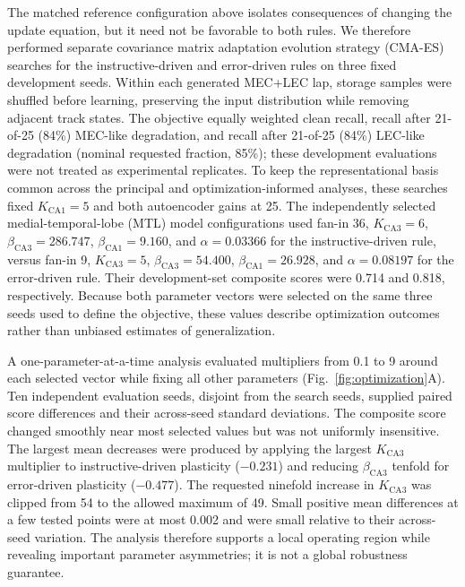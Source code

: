 The matched reference configuration above isolates consequences of changing
the update equation, but it need not be favorable to both rules. We therefore
performed separate covariance matrix adaptation evolution strategy (CMA-ES)
searches for the instructive-driven and error-driven rules on three fixed
development seeds. Within each generated MEC+LEC lap, storage samples were
shuffled before learning, preserving the input distribution while removing
adjacent track states. The objective equally weighted clean recall, recall after
21-of-25 (84\%) MEC-like degradation, and recall after 21-of-25 (84\%)
LEC-like degradation (nominal requested fraction, 85\%); these
development evaluations were not treated as experimental replicates. To keep
the representational basis common across the principal and optimization-informed
analyses, these searches fixed $K_{\mathrm{CA1}}=5$ and both autoencoder gains
at 25. The independently selected medial-temporal-lobe (MTL) model
configurations used fan-in 36,
$K_{\mathrm{CA3}}=6$, $\beta_{\mathrm{CA3}}=286.747$,
$\beta_{\mathrm{CA1}}=9.160$, and $\alpha=0.03366$ for the
instructive-driven rule, versus fan-in 9, $K_{\mathrm{CA3}}=5$,
$\beta_{\mathrm{CA3}}=54.400$, $\beta_{\mathrm{CA1}}=26.928$, and
$\alpha=0.08197$ for the error-driven rule. Their development-set composite
scores were 0.714 and 0.818, respectively. Because both parameter vectors were selected on the same
three seeds used to define the objective, these values describe optimization
outcomes rather than unbiased estimates of generalization.

A one-parameter-at-a-time analysis evaluated multipliers from 0.1 to 9 around
each selected vector while fixing all other parameters
(Fig.~\ref{fig:optimization}A). Ten independent evaluation seeds, disjoint from
the search seeds, supplied paired score differences and their across-seed
standard deviations. The composite score changed smoothly near most selected
values but was not uniformly insensitive. The largest mean decreases were
produced by applying the largest $K_{\mathrm{CA3}}$ multiplier to instructive-driven
plasticity ($-0.231$) and reducing $\beta_{\mathrm{CA3}}$ tenfold for
error-driven plasticity ($-0.477$). The requested ninefold increase in
$K_{\mathrm{CA3}}$ was clipped from 54 to the allowed maximum of 49.
Small positive mean differences at a few
tested points were at most 0.002 and were small relative to their across-seed
variation. The analysis therefore supports a local
operating region while revealing important parameter asymmetries; it is not a
global robustness guarantee.

